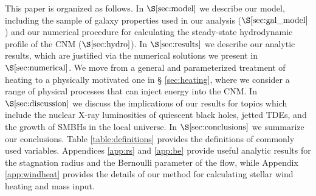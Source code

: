\documentclass[usenatbib,fleqn]{mn2e}
\begin{document}
This paper is organized as follows.  In $\S\ref{sec:model}$ we
describe our model, including the sample of galaxy properties used in
our analysis ($\S\ref{sec:gal_model}$) and our numerical procedure for
calculating the steady-state hydrodynamic profile of the CNM
($\S\ref{sec:hydro}$).  In $\S\ref{sec:results}$ we describe our
analytic results, which are justified via the numerical solutions we
present in $\S\ref{sec:numerical}$.  We move from a general and
parameterized treatment of heating to a physically motivated one in \S
\ref{sec:heating}, where we consider a range of physical processes
that can inject energy into the CNM.  In $\S\ref{sec:discussion}$ we
discuss the implications of our results for topics which include the
nuclear X-ray luminosities of quiescent black holes, jetted TDEs, and
the growth of SMBHs in the local universe.  In
$\S\ref{sec:conclusions}$ we summarize our conclusions.  Table
\ref{table:definitions} provides the definitions of commonly used
variables.  Appendices \ref{app:rs} and \ref{app:be} provide useful
analytic results for the stagnation radius and the Bernoulli parameter
of the flow, while Appendix \ref{app:windheat} provides the details of
our method for calculating stellar wind heating and mass input.
\end{document}
